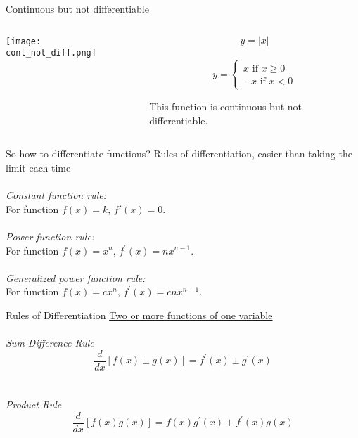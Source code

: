 \documentclass{./../../Latex/teaching_slides}
\begin{document}
\begin{frame}{Continuous but not differentiable}
\vspace{1em}
\centering
\begin{columns}[c]
\begin{column}{0.6\textwidth}
\texttt{[image: cont\_not\_diff.png]}
\end{column}
\begin{column}{0.4\textwidth}
$$ y = |x| $$\\

$$ y = \begin{cases} x  \text{ if }x \geq 0  \\
-x \text{ if }x<0 \end{cases} $$
\vspace{1em}

This function is continuous but not differentiable. 
\end{column} 
\end{columns}
\end{frame}

\begin{frame}{So how to differentiate functions?}
Rules of differentiation, easier than taking the limit each time \\~\\
\textit{Constant function rule:}\\
For function \(f(x)=k \), $ f'(x)=0 $.\\~\\
\textit{Power function rule:}\\
For function \( f(x)=x^{n} \), \( f^{\prime}(x)=n x^{n-1} \).\\~\\
\textit{Generalized power function rule:}\\
For function \( f(x)=c x^{n} \), \( f^{\prime}(x)=c n x^{n-1} \).
\end{frame}

\begin{frame}{Rules of Differentiation}
\underline{Two or more functions of one variable} \\~\\ 
\textit{Sum-Difference Rule}
$$ \frac{d}{d x}[f(x) \pm g(x)]=f^{\prime}(x) \pm g^{\prime}(x) $$\\~\\

\textit{Product Rule} \\
$$
\frac{d}{d x}[f(x) g(x)]=f(x) g^{\prime}(x)+f^{\prime}(x) g(x)
$$
\end{frame}
\end{document}
